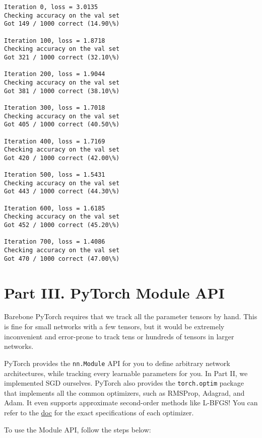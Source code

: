 \documentclass[11pt]{article}
\begin{document}
    \begin{Verbatim}[commandchars=\\\{\}]
Iteration 0, loss = 3.0135
Checking accuracy on the val set
Got 149 / 1000 correct (14.90\%)

Iteration 100, loss = 1.8718
Checking accuracy on the val set
Got 321 / 1000 correct (32.10\%)

Iteration 200, loss = 1.9044
Checking accuracy on the val set
Got 381 / 1000 correct (38.10\%)

Iteration 300, loss = 1.7018
Checking accuracy on the val set
Got 405 / 1000 correct (40.50\%)

Iteration 400, loss = 1.7169
Checking accuracy on the val set
Got 420 / 1000 correct (42.00\%)

Iteration 500, loss = 1.5431
Checking accuracy on the val set
Got 443 / 1000 correct (44.30\%)

Iteration 600, loss = 1.6185
Checking accuracy on the val set
Got 452 / 1000 correct (45.20\%)

Iteration 700, loss = 1.4086
Checking accuracy on the val set
Got 470 / 1000 correct (47.00\%)

    \end{Verbatim}

    \hypertarget{part-iii.-pytorch-module-api}{%
\section{Part III. PyTorch Module
API}\label{part-iii.-pytorch-module-api}}

Barebone PyTorch requires that we track all the parameter tensors by
hand. This is fine for small networks with a few tensors, but it would
be extremely inconvenient and error-prone to track tens or hundreds of
tensors in larger networks.

PyTorch provides the \texttt{nn.Module} API for you to define arbitrary
network architectures, while tracking every learnable parameters for
you. In Part II, we implemented SGD ourselves. PyTorch also provides the
\texttt{torch.optim} package that implements all the common optimizers,
such as RMSProp, Adagrad, and Adam. It even supports approximate
second-order methods like L-BFGS! You can refer to the
\href{http://pytorch.org/docs/master/optim.html}{doc} for the exact
specifications of each optimizer.

To use the Module API, follow the steps below:
\end{document}
